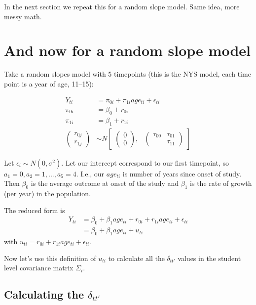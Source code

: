 \documentclass[
  letterpaper,
  DIV=11,
  numbers=noendperiod]{scrreprt}
\begin{document}
In the next section we repeat this for a random slope model. Same idea,
more messy math.

\section{And now for a random slope
model}\label{and-now-for-a-random-slope-model}

Take a random slopes model with 5 timepoints (this is the NYS model,
each time point is a year of age, 11--15):

\[
\begin{aligned}
Y_{ti} &= \pi_{0i} + \pi_{1i} age_{ti} + \epsilon_{ti} \\
\pi_{0i} &=  \beta_{0} + r_{0i} \\
\pi_{1i} &= \beta_{1} + r_{1i} \\
\begin{pmatrix} r_{0j} \\
r_{1j}
\end{pmatrix} &\sim  N
\begin{bmatrix}
\begin{pmatrix}
0 \\
0
\end{pmatrix}\!\!,&
\begin{pmatrix}
\tau_{00} & \tau_{01} \\
        & \tau_{11} 
\end{pmatrix}
\end{bmatrix}
\end{aligned}
\]

Let \(\epsilon_i \sim N(0, \sigma^2)\). Let our intercept correspond to
our first timepoint, so \(a_1 = 0, a_2 = 1, ..., a_5 = 4\). I.e., our
\(age_{ti}\) is number of years since onset of study. Then \(\beta_{0}\)
is the average outcome at onset of the study and \(\beta_{1}\) is the
rate of growth (per year) in the population.

The reduced form is \[\begin{aligned}
 Y_{ti} &= \beta_{0}  + \beta_{1}  age_{ti}  + r_{0i} + r_{1i} age_{ti} + \epsilon_{ti} \\ 
 &= \beta_{0}  + \beta_{1}  age_{ti}  + u_{ti} 
\end{aligned}\] with
\(u_{ti} = r_{0i} + r_{1i} age_{ti} + \epsilon_{ti}\).

Now let's use this definition of \(u_{ti}\) to calculate all the
\(\delta_{tt'}\) values in the student level covariance matrix
\(\Sigma_i\).

\subsection*{\texorpdfstring{Calculating the
\(\delta_{tt'}\)}{Calculating the \textbackslash delta\_\{tt\textquotesingle\}}}\label{calculating-the-delta_tt}
\end{document}
